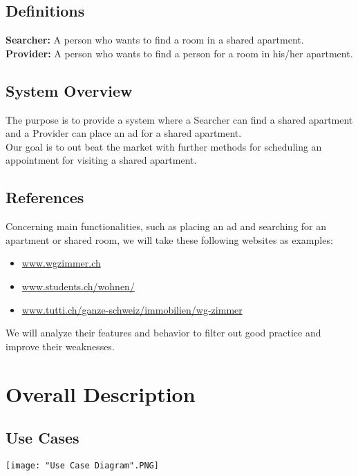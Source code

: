 \documentclass{scrreprt}
\begin{document}
\section{Definitions}
\textbf{Searcher:} A person who wants to find a room in a shared apartment.\\
\textbf{Provider:} A person who wants to find a person for a room in his/her apartment.
\section{System Overview}
The purpose is to provide a system where a Searcher can find a shared apartment and a Provider can place an ad for a shared apartment. \\
Our goal is to out beat the market with further methods for scheduling an appointment for visiting a shared apartment.
\section{References}
Concerning main functionalities, such as placing an ad and searching for an apartment or shared room, we will take these following websites as examples:\\
\begin{itemize}
\item \url{www.wgzimmer.ch}
\item \url{www.students.ch/wohnen/} 
\item \url{www.tutti.ch/ganze-schweiz/immobilien/wg-zimmer} 
\end{itemize}

We will analyze their features and behavior to filter out good practice and improve their weaknesses.
 
\chapter{Overall Description}
\section{Use Cases}

\begin{center}
\texttt{[image: "Use Case Diagram".PNG]} 
\end{center}
\end{document}
